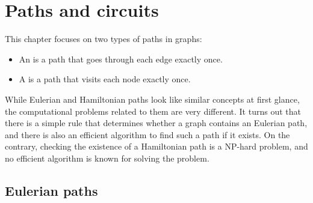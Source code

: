 \chapter{Paths and circuits}

This chapter focuses on two types of paths in graphs:
\begin{itemize}
\item An  is a path that
goes through each edge exactly once.
\item A  is a path
that visits each node exactly once.
\end{itemize}

While Eulerian and Hamiltonian paths look like
similar concepts at first glance,
the computational problems related to them
are very different.
It turns out that there is a simple rule that
determines whether a graph contains an Eulerian path,
and there is also an efficient algorithm to
find such a path if it exists.
On the contrary, checking the existence of a Hamiltonian path is a NP-hard
problem, and no efficient algorithm is known for solving the problem.

\section{Eulerian paths}


